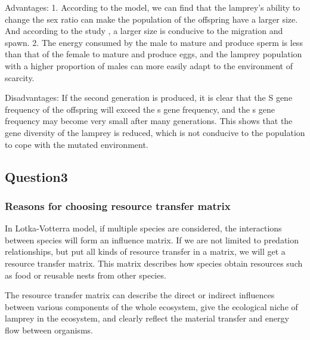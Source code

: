 \documentclass[12pt]{article}
\begin{document}
Advantages: 1. According to the model, we can find that the lamprey's ability to change
the sex ratio can make the population of the offspring have a larger size. And according
to the study \cite{hess_genes_2014}, a larger size is conducive to the migration and
spawn. 2. The energy consumed by the male to mature and produce sperm is less than that of
the female to mature and produce eggs, and the lamprey population with a higher proportion of
males can more easily adapt to the environment of scarcity.

Disadvantages: If the second generation is produced, it is clear that the S gene frequency
of the offspring will exceed the s gene frequency, and the s gene frequency may become
very small after many generations. This shows that the gene diversity of the lamprey
is reduced, which is not conducive to the population to cope with the mutated environment.

\subsection{Question3}
\subsubsection{Reasons for choosing resource transfer matrix}
In Lotka-Votterra model, if multiple species are considered, the interactions between species
will form an influence matrix. If we are not limited to predation relationships, but put all
kinds of resource transfer in a matrix, we will get a resource transfer matrix. This matrix
describes how species obtain resources such as food or reusable nests from other species.

The resource transfer matrix can describe the direct or indirect influences between various
components of the whole ecosystem, give the ecological niche of lamprey in the ecosystem,
and clearly reflect the material transfer and energy flow between organisms.
\end{document}
